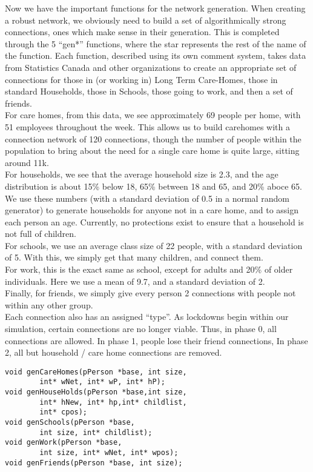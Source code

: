 \documentclass{article}
\numberwithin{equation}{section} %
\theoremstyle{definition}
\begin{document}
\begin{multicols*}{2}
Now we have the important functions for the network generation. When creating a robust network, we obviously need to build a set of algorithmically strong connections, ones which make sense in their generation. This is completed through the 5 ``gen*'' functions, where the star represents the rest of the name of the function. Each function, described using its own comment system, takes data from Statistics Canada and other organizations to create an appropriate set of connections for those in (or working in) Long Term Care-Homes, those in standard Households, those in Schools, those going to work, and then a set of friends. \\

For care homes, from this data, we see approximately 69 people per home, with 51 employees throughout the week. This allows us to build carehomes with a connection network of 120 connections, though the number of people within the population to bring about the need for a single care home is quite large, sitting around 11k. \\

For households, we see that the average household size is 2.3, and the age distribution is about 15\% below 18, 65\% between 18 and 65, and 20\% aboce 65. We use these numbers (with a standard deviation of 0.5 in a normal random generator) to generate households for anyone not in a care home, and to assign each person an age. Currently, no protections exist to ensure that a household is not full of children. \\

For schools, we use an average class size of 22 people, with a standard deviation of 5. With this, we simply get that many children, and connect them. \\

For work, this is the exact same as school, except for adults and 20\% of older individuals. Here we use a mean of 9.7, and a standard deviation of 2. \\

Finally, for friends, we simply give every person 2 connections with people not within any other group. \\

Each connection also has an assigned ``type''. As lockdowns begin within our simulation, certain connections are no longer viable. Thus, in phase 0, all connections are allowed. In phase 1, people lose their friend connections, In phase 2, all but household / care home connections are removed.
\begin{lstlisting}
void genCareHomes(pPerson *base, int size,
        int* wNet, int* wP, int* hP);
void genHouseHolds(pPerson *base,int size,
        int* hNew, int* hp,int* childlist,
        int* cpos);
void genSchools(pPerson *base,
        int size, int* childlist);
void genWork(pPerson *base,
        int size, int* wNet, int* wpos);
void genFriends(pPerson *base, int size);
\end{lstlisting}


\end{multicols*}
\end{document}
